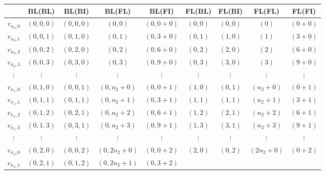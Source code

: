 \documentclass[a4paper,10pt,headings=normal,bibliography=totoc]{scrartcl}
\begin{document}
\begin{table}
\footnotesize
\begin{center}
\begin{tabular}{c|c|c|c|c|c|c|c|c}
    & BL(BL)
    & BL(BI)
    & BL(FL)
    & BL(FI)
    & FL(BL)
    & FL(BI)
    & FL(FL)
    & FL(FI)
    \\
  \hline
  $v_{x_0,0}$
    & $(0,0,0)$
    & $(0,0,0)$
    & $(0,0)$
    & $(0,0+0)$
    & $(0,0)$
    & $(0,0)$
    & $(0)$
    & $(0+0)$
    \\
  $v_{x_0,1}$
    & $(0,0,1)$
    & $(0,1,0)$
    & $(0,1)$
    & $(0,3+0)$
    & $(0,1)$
    & $(1,0)$
    & $(1)$
    & $(3+0)$
    \\
  $v_{x_0,2}$
    & $(0,0,2)$
    & $(0,2,0)$
    & $(0,2)$
    & $(0,6+0)$
    & $(0,2)$
    & $(2,0)$
    & $(2)$
    & $(6+0)$
    \\
  $v_{x_0,3}$
    & $(0,0,3)$
    & $(0,3,0)$
    & $(0,3)$
    & $(0,9+0)$
    & $(0,3)$
    & $(3,0)$
    & $(3)$
    & $(9+0)$
    \\
  $\vdots$ & $\vdots$ & $\vdots$ & $\vdots$ &  $\vdots$ & $\vdots$ & $\vdots$ & $\vdots$ & $\vdots$
  \\
  $v_{x_1,0}$
    & $(0,1,0)$
    & $(0,0,1)$
    & $(0,n_2+0)$
    & $(0,0+1)$
    & $(1,0)$
    & $(0,1)$
    & $(n_2+0)$
    & $(0+1)$
    \\
  $v_{x_1,1}$
    & $(0,1,1)$
    & $(0,1,1)$
    & $(0,n_2+1)$
    & $(0,3+1)$
    & $(1,1)$
    & $(1,1)$
    & $(n_2+1)$
    & $(3+1)$
    \\
  $v_{x_1,2}$
    & $(0,1,2)$
    & $(0,2,1)$
    & $(0,n_2+2)$
    & $(0,6+1)$
    & $(1,2)$
    & $(2,1)$
    & $(n_2+2)$
    & $(6+1)$
    \\
  $v_{x_1,3}$
    & $(0,1,3)$
    & $(0,3,1)$
    & $(0,n_2+3)$
    & $(0,9+1)$
    & $(1,3)$
    & $(3,1)$
    & $(n_2+3)$
    & $(9+1)$
    \\
  $\vdots$ & $\vdots$ & $\vdots$ & $\vdots$ &  $\vdots$ & $\vdots$ & $\vdots$ & $\vdots$ & $\vdots$
  \\
  $v_{x_2,0}$
    & $(0,2,0)$
    & $(0,0,2)$
    & $(0,2n_2+0)$
    & $(0,0+2)$
    & $(2,0)$
    & $(0,2)$
    & $(2n_2+0)$
    & $(0+2)$
    \\
  $v_{x_2,1}$
    & $(0,2,1)$
    & $(0,1,2)$
    & $(0,2n_2+1)$
    & $(0,3+2)$

\end{tabular}
\end{center}
\end{table}
\end{document}
